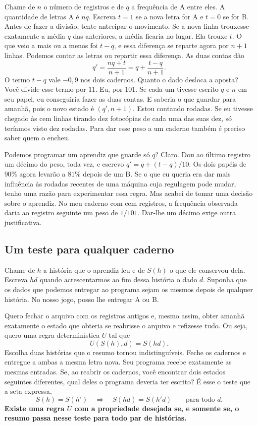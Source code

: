 \documentclass[12pt,oneside]{article}
\newcommand{\secao}[1]{\Needspace{5.2\baselineskip}\subsection*{#1}}
\newcommand{\bookanchor}[1]{\phantomsection\label{#1}}
\begin{document}
Chame de $n$ o número de registros e de $q$ a frequência de A entre eles. A quantidade de letras A é $nq$. Escreva $t=1$ se a nova letra for A e $t=0$ se for B. Antes de fazer a divisão, tente antecipar o movimento. Se a nova linha trouxesse exatamente a média $q$ das anteriores, a média ficaria no lugar. Ela trouxe $t$. O que veio a mais ou a menos foi $t-q$, e essa diferença se reparte agora por $n+1$ linhas. Podemos contar as letras ou repartir essa diferença. As duas contas dão
\[
 q'=\frac{nq+t}{n+1}
    =q+\frac{t-q}{n+1}.
\]
O termo $t-q$ vale $-0{,}9$ nos dois cadernos. Quanto o dado desloca a aposta? Você divide esse termo por $11$. Eu, por $101$. Se cada um tivesse escrito $q$ e $n$ em seu papel, eu conseguiria fazer as duas contas. E saberia o que guardar para amanhã, pois o novo estado é $(q',n+1)$. Estou contando rodadas. Se eu tivesse chegado às cem linhas tirando dez fotocópias de cada uma das suas dez, só teríamos visto dez rodadas. Para dar esse peso a um caderno também é preciso saber quem o encheu.

Podemos programar um aprendiz que guarde só $q$? Claro. Dou ao último registro um décimo do peso, toda vez, e escrevo $q'=q+(t-q)/10$. Os dois papéis de $90\%$ agora levarão a $81\%$ depois de um B. Se o que eu queria era dar mais influência às rodadas recentes de uma máquina cuja regulagem pode mudar, tenho uma razão para experimentar essa regra. Mas acabei de tomar uma decisão sobre o aprendiz. No meu caderno com cem registros, a frequência observada daria ao registro seguinte um peso de $1/101$. Dar-lhe um décimo exige outra justificativa.

\secao{Um teste para qualquer caderno}
Chame\bookanchor{topic-07-1} de $h$ a história que o aprendiz leu e de $S(h)$ o que ele conservou dela. Escreva $hd$ quando acrescentarmos ao fim dessa história o dado $d$. Suponha que os dados que podemos entregar ao programa sejam os mesmos depois de qualquer história. No nosso jogo, posso lhe entregar A ou B.

Quero fechar o arquivo com os registros antigos e, mesmo assim, obter amanhã exatamente o estado que obteria se reabrisse o arquivo e refizesse tudo. Ou seja, quero uma regra determinística $U$ tal que
\[
                        U(S(h),d)=S(hd).
\]
Escolha duas histórias que o resumo tornou indistinguíveis. Feche os cadernos e entregue a ambas a mesma letra nova. Seu programa recebe exatamente as mesmas entradas. Se, ao reabrir os cadernos, você encontrar dois estados seguintes diferentes, qual deles o programa deveria ter escrito? É esse o teste que a seta expressa,
\[
              S(h)=S(h')\quad\Longrightarrow\quad S(hd)=S(h'd)
              \qquad\text{para todo }d .
\]
\textbf{Existe uma regra $U$ com a propriedade desejada se, e somente se, o resumo passa nesse teste para todo par de histórias.}
\end{document}

